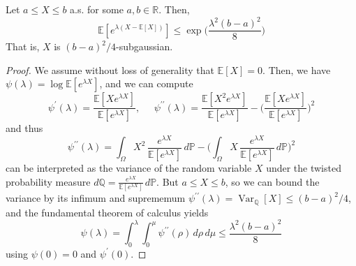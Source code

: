 \documentclass{article}
\DeclareMathOperator{\Var}{Var}
\begin{document}
\begin{lemma}
Let $a \leq X \leq b$ a.s. for some $a, b \in \mathbb{R}$. Then, 
\[\mathbb{E}[e^{\lambda(X - \mathbb{E}[X])}] \leq \exp \bigg( \frac{\lambda^2 (b - a)^2}{8} \bigg)\]
That is, $X$ is $(b-a)^2 /4$-subgaussian. 
\end{lemma}
\begin{proof}
We assume without loss of generality that $\mathbb{E}[X] = 0$. Then, we have $\psi(\lambda) = \log \mathbb{E}[ e^{\lambda X}]$, and we can compute 
\[\psi^\prime (\lambda) = \frac{\mathbb{E}[X e^{\lambda X}]}{\mathbb{E}[e^{\lambda X}]}, \;\;\;\;\; \psi^{\prime\prime} (\lambda) = \frac{\mathbb{E}[X^2 e^{\lambda X}]}{\mathbb{E}[e^{\lambda X}]} - \bigg( \frac{\mathbb{E}[X e^{\lambda X}]}{\mathbb{E}[e^{\lambda X}]} \bigg)^2\]
and thus 
\[\psi^{\prime\prime} (\lambda) = \int_\Omega X^2 \, \frac{e^{\lambda X}}{\mathbb{E}[e^{\lambda X}]} \,d\mathbb{P} - \bigg( \int_\Omega X \, \frac{e^{\lambda X}}{\mathbb{E}[e^{\lambda X}]} \,d\mathbb{P} \bigg)^2 \] 
can be interpreted as the variance of the random variable $X$ under the twisted probability measure $d\mathbb{Q} = \frac{e^{\lambda X}}{\mathbb{E}[e^{\lambda X}]} \,d\mathbb{P}$. But $a \leq X \leq b$, so we can bound the variance by its infimum and suprememum $\psi^{\prime\prime} (\lambda) = \Var_\mathbb{Q} [X] \leq (b-a)^2 / 4$, and the fundamental theorem of calculus yields 
\[\psi(\lambda) = \int_0^\lambda \int_0^\mu \psi^{\prime\prime} (\rho) \, d\rho \, d\mu \leq \frac{\lambda^2 (b - a)^2}{8}\]
using $\psi(0) = 0$ and $\psi^\prime (0)$. 
\end{proof}
\end{document}
